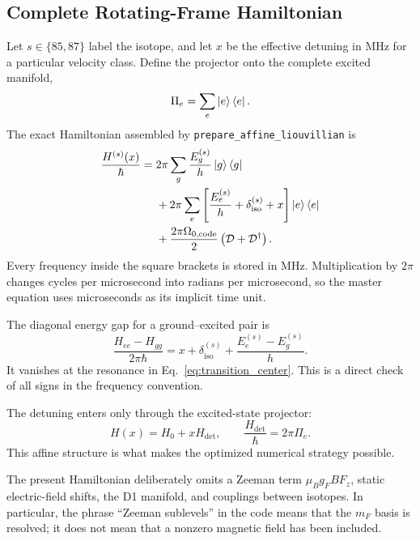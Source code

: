 \subsection{Complete Rotating-Frame Hamiltonian}
\label{subsec:dm_complete_hamiltonian}

Let \(s\in\{85,87\}\) label the isotope, and let \(x\) be the effective
detuning in MHz for a particular velocity class.  Define the projector onto
the complete excited manifold,
\begin{equation}
\Pi_e=\sum_e\left|e\right\rangle\left\langle e\right|.
\end{equation}
The exact Hamiltonian assembled by \texttt{prepare\_affine\_liouvillian} is
\begin{equation}
\begin{split}
\frac{H^{(s)}(x)}{\hbar}
={}&
2\pi\sum_g
\frac{E_g^{(s)}}{h}\left|g\right\rangle\left\langle g\right|
\\
&+
2\pi\sum_e
\left[
\frac{E_e^{(s)}}{h}
+\delta_{\mathrm{iso}}^{(s)}
+x
\right]\left|e\right\rangle\left\langle e\right|
\\
&+
\frac{2\pi\Omega_{0,\mathrm{code}}}{2}
\left(\mathcal{D}+\mathcal{D}^{\dagger}\right).
\end{split}
\label{eq:complete_rotating_hamiltonian}
\end{equation}
Every frequency inside the square brackets is stored in MHz.  Multiplication
by \(2\pi\) changes cycles per microsecond into radians per microsecond, so the
master equation uses microseconds as its implicit time unit.

The diagonal energy gap for a ground--excited pair is
\begin{equation}
\frac{H_{ee}-H_{gg}}{2\pi\hbar}
=
x+\delta_{\mathrm{iso}}^{(s)}
+\frac{E_e^{(s)}-E_g^{(s)}}{h}.
\end{equation}
It vanishes at the resonance in Eq.~\eqref{eq:transition_center}.  This is a
direct check of all signs in the frequency convention.

The detuning enters only through the excited-state projector:
\begin{equation}
H(x)=H_0+xH_{\mathrm{det}},
\qquad
\frac{H_{\mathrm{det}}}{\hbar}=2\pi\Pi_e.
\label{eq:affine_hamiltonian}
\end{equation}
This affine structure is what makes the optimized numerical strategy
possible.

The present Hamiltonian deliberately omits a Zeeman term
\(\mu_B g_F B F_z\), static electric-field shifts, the D1 manifold, and
couplings between isotopes.  In particular, the phrase ``Zeeman sublevels''
in the code means that the \(m_F\) basis is resolved; it does not mean that a
nonzero magnetic field has been included.

